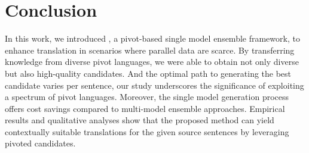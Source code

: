 \section{Conclusion}


In this work, we introduced \ours, a pivot-based single model ensemble framework, to enhance translation in scenarios where parallel data are scarce.
By transferring knowledge from diverse pivot languages, we were able to obtain not only diverse but also high-quality candidates.
And the optimal path to generating the best candidate varies per sentence, our study underscores the significance of exploiting a spectrum of pivot languages.
Moreover, the single model generation process offers cost savings compared to multi-model ensemble approaches. 
Empirical results and qualitative analyses show that the proposed method can yield contextually suitable translations for the given source sentences by leveraging pivoted candidates.